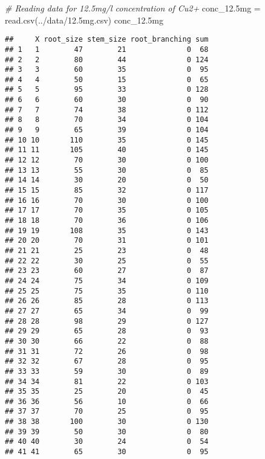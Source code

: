 \documentclass[
]{article}
\newenvironment{Shaded}{\begin{snugshade}}{\end{snugshade}}
\newcommand{\CommentTok}[1]{\textcolor[rgb]{0.56,0.35,0.01}{\textit{#1}}}
\newcommand{\FloatTok}[1]{\textcolor[rgb]{0.00,0.00,0.81}{#1}}
\newcommand{\FunctionTok}[1]{\textcolor[rgb]{0.00,0.00,0.00}{#1}}
\newcommand{\NormalTok}[1]{#1}
\newcommand{\OtherTok}[1]{\textcolor[rgb]{0.56,0.35,0.01}{#1}}
\newcommand{\StringTok}[1]{\textcolor[rgb]{0.31,0.60,0.02}{#1}}
\begin{document}
\begin{Shaded}
\begin{Highlighting}[]
\CommentTok{\# Reading data for 12.5mg/l concentration of Cu2+}
\NormalTok{conc\_12}\FloatTok{.5}\NormalTok{mg }\OtherTok{=} \FunctionTok{read.csv}\NormalTok{(}\StringTok{\textquotesingle{}../data/12.5mg.csv\textquotesingle{}}\NormalTok{)}
\NormalTok{conc\_12}\FloatTok{.5}\NormalTok{mg}
\end{Highlighting}
\end{Shaded}

\begin{verbatim}
##     X root_size stem_size root_branching sum
## 1   1        47        21              0  68
## 2   2        80        44              0 124
## 3   3        60        35              0  95
## 4   4        50        15              0  65
## 5   5        95        33              0 128
## 6   6        60        30              0  90
## 7   7        74        38              0 112
## 8   8        70        34              0 104
## 9   9        65        39              0 104
## 10 10       110        35              0 145
## 11 11       105        40              0 145
## 12 12        70        30              0 100
## 13 13        55        30              0  85
## 14 14        30        20              0  50
## 15 15        85        32              0 117
## 16 16        70        30              0 100
## 17 17        70        35              0 105
## 18 18        70        36              0 106
## 19 19       108        35              0 143
## 20 20        70        31              0 101
## 21 21        25        23              0  48
## 22 22        30        25              0  55
## 23 23        60        27              0  87
## 24 24        75        34              0 109
## 25 25        75        35              0 110
## 26 26        85        28              0 113
## 27 27        65        34              0  99
## 28 28        98        29              0 127
## 29 29        65        28              0  93
## 30 30        66        22              0  88
## 31 31        72        26              0  98
## 32 32        67        28              0  95
## 33 33        59        30              0  89
## 34 34        81        22              0 103
## 35 35        25        20              0  45
## 36 36        56        10              0  66
## 37 37        70        25              0  95
## 38 38       100        30              0 130
## 39 39        50        30              0  80
## 40 40        30        24              0  54
## 41 41        65        30              0  95

\end{verbatim}
\end{document}
